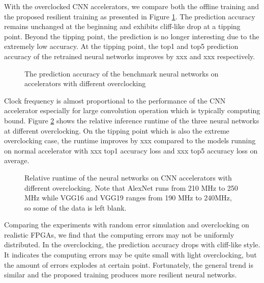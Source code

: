 With the overclocked CNN accelerators, we compare both the offline 
training and the proposed resilient training as presented in Figure \ref{fig:overclock-accuracy}. 
The prediction accuracy remains unchanged at the beginning and exhibits cliff-like drop 
at a tipping point. Beyond the tipping point, the prediction is no longer interesting 
due to the extremely low accuracy. At the tipping point, the top1 and top5 prediction accuracy of the 
retrained neural networks improves by xxx and xxx respectively.

\begin{figure}
        \center
	\qquad
        \qquad
	\caption{The prediction accuracy of the benchmark neural networks on accelerators with different overclocking}
        \label{fig:overclock-accuracy}
\end{figure}

Clock frequency is almost proportional to the performance of the CNN accelerator 
especially for large convolution operation which is typically computing bound. 
Figure \ref{fig:overclocking-time} shows the relative inference runtime of the three neural networks at different 
overclocking. On the tipping point which is also the extreme overclocking case, 
the runtime improves by xxx compared to the models running on normal accelerator with 
xxx top1 accuracy loss and xxx top5 accuracy loss on average. 
\begin{figure}
        \caption{Relative runtime of the neural networks on CNN accelerators with different overclocking. Note that AlexNet runs from 210 MHz to 250 MHz while 
		VGG16 and VGG19 ranges from 190 MHz to 240MHz, so some of the data is left blank.}
        \label{fig:overclocking-time}
\end{figure}

Comparing the experiments with random error simulation and overclocking on realistic FPGAs, we
find that the computing errors may not be uniformly distributed. In the overclocking,  
the prediction accuracy drops with cliff-like style. It indicates the computing errors may 
be quite small with light overclocking, but the amount of errors explodes at certain point.
Fortunately, the general trend is similar and the proposed training produces more resilient 
neural networks. 


